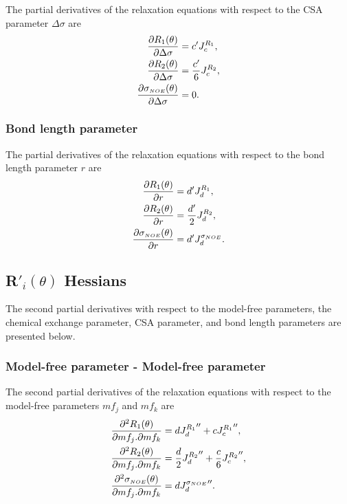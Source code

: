 The partial derivatives of the relaxation equations with respect to the CSA parameter $\Delta\sigma$ are
\begin{align}
    \frac{\partial R_1(\theta)}{\partial \Delta\sigma} &= c' J_c^{R_1},             \label{eq: Ri': dR1/dCSA} \\
    \frac{\partial R_2(\theta)}{\partial \Delta\sigma} &= \frac{c'}{6} J_c^{R_2},   \label{eq: Ri': dR2/dCSA} \\
    \frac{\partial \sigma_{\scriptscriptstyle NOE}(\theta)}{\partial \Delta\sigma} &= 0.                  \label{eq: Ri': dsigmaNOE/dCSA}
\end{align}


\subsubsection{Bond length parameter}

The partial derivatives of the relaxation equations with respect to the bond length parameter $r$ are
\begin{align}
    \frac{\partial R_1(\theta)}{\partial r} &= d' J_d^{R_1},                \label{eq: Ri': dR1/dr} \\
    \frac{\partial R_2(\theta)}{\partial r} &= \frac{d'}{2} J_d^{R_2},      \label{eq: Ri': dR2/dr} \\
    \frac{\partial \sigma_{\scriptscriptstyle NOE}(\theta)}{\partial r} &= d' J_d^{\sigma_{\scriptscriptstyle NOE}}.    \label{eq: Ri': dsigmaNOE/dr}
\end{align}



\subsection{R$'_i(\theta)$ Hessians}

The second partial derivatives with respect to the model-free parameters, the chemical exchange parameter, CSA parameter, and bond length parameters are presented below.


\subsubsection{Model-free parameter - Model-free parameter}

The second partial derivatives of the relaxation equations with respect to the model-free parameters $mf_j$ and $mf_k$ are
\begin{align}
    \frac{\partial^2 R_1(\theta)}{\partial mf_j . \partial mf_k} &= d {J_d^{R_1}}'' + c {J_c^{R_1}}'',                      \label{eq: Ri': d2R1/dmfj.dmfk} \\
    \frac{\partial^2 R_2(\theta)}{\partial mf_j . \partial mf_k} &= \frac{d}{2} {J_d^{R_2}}'' + \frac{c}{6} {J_c^{R_2}}'',  \label{eq: Ri': d2R2/dmfj.dmfk} \\
    \frac{\partial^2 \sigma_{\scriptscriptstyle NOE}(\theta)}{\partial mf_j . \partial mf_k} &= d {J_d^{\sigma_{\scriptscriptstyle NOE}}}''.                            \label{eq: Ri': d2sigmaNOE/dmfj.dmfk}
\end{align}


